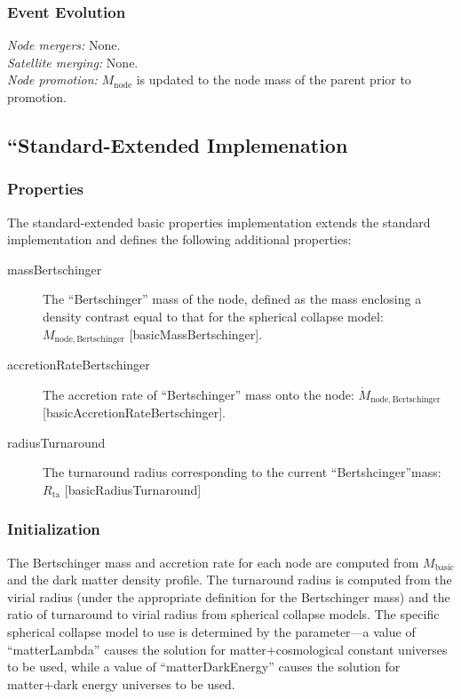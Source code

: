 \subsubsection{Event Evolution}

\noindent\emph{Node mergers:} None.\\

\noindent\emph{Satellite merging:} None.\\

\noindent\emph{Node promotion:} $M_\mathrm{node}$ is updated to the \gls{node} mass of the parent prior to promotion.\\

\subsection{``Standard-Extended Implemenation}

\subsubsection{Properties}

The standard-extended basic properties implementation extends the standard implementation and defines the following additional properties:
\begin{description}
 \item [{\normalfont \ttfamily massBertschinger}] The ``Bertschinger'' mass of the node, defined as the mass enclosing a density contrast equal to that for the spherical collapse model: $M_\mathrm{node, Bertschinger}$ [{\normalfont \ttfamily basicMassBertschinger}].
 \item [{\normalfont \ttfamily accretionRateBertschinger}] The accretion rate of ``Bertschinger'' mass onto the node: $\dot{M}_\mathrm{node, Bertschinger}$ [{\normalfont \ttfamily basicAccretionRateBertschinger}].
 \item [{\normalfont \ttfamily radiusTurnaround}] The turnaround radius corresponding to the current ``Bertshcinger''mass: $R_\mathrm{ta}$ [{\normalfont \ttfamily basicRadiusTurnaround}]
\end{description}

\subsubsection{Initialization}

The Bertschinger mass and accretion rate for each node are computed from $M_\mathrm{basic}$ and the dark matter density profile. The turnaround radius is computed from the virial radius (under the appropriate definition for the Bertschinger mass) and the ratio of turnaround to virial radius from spherical collapse models. The specific spherical collapse model to use is determined by the {\normalfont \ttfamily [nodeComponentBasicExtendedSphericalCollapseType]} parameter---a value of ``{\normalfont \ttfamily matterLambda}'' causes the solution for matter+cosmological constant universes to be used, while a value of ``{\normalfont \ttfamily matterDarkEnergy}'' causes the solution for matter+dark energy universes to be used.


